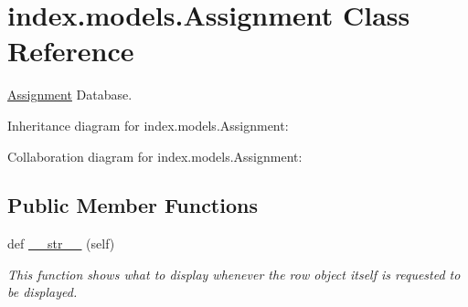 \hypertarget{classindex_1_1models_1_1Assignment}{}\section{index.\+models.\+Assignment Class Reference}
\label{classindex_1_1models_1_1Assignment}


\hyperlink{classindex_1_1models_1_1Assignment}{Assignment} Database.  




Inheritance diagram for index.\+models.\+Assignment\+:


Collaboration diagram for index.\+models.\+Assignment\+:
\subsection*{Public Member Functions}
\begin{DoxyCompactItemize}
\item 
def \hyperlink{classindex_1_1models_1_1Assignment_a3979c226df312c7527826796407afe7d}{\+\_\+\+\_\+str\+\_\+\+\_\+} (self)
\begin{DoxyCompactList}\small\item\em This function shows what to display whenever the row object itself is requested to be displayed. \end{DoxyCompactList}\end{DoxyCompactItemize}

